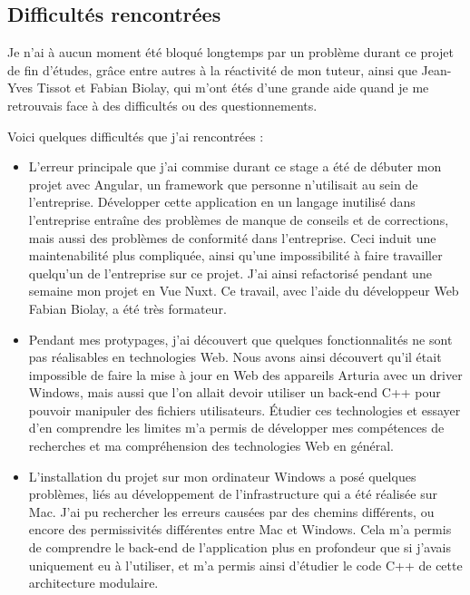 \documentclass[francais]{rapportPFE}  %
\begin{document}
\subsection{Difficultés rencontrées}
Je n'ai à aucun moment été bloqué longtemps par un problème durant ce projet de fin d'études, grâce entre autres à la réactivité de mon tuteur, ainsi que Jean-Yves Tissot et Fabian Biolay, qui m'ont étés d'une grande aide quand je me retrouvais face à des difficultés ou des questionnements. 

Voici quelques difficultés que j'ai rencontrées : 
\begin{itemize}
    \item L'erreur principale que j'ai commise durant ce stage a été de débuter mon projet avec Angular, un framework que personne n'utilisait au sein de l'entreprise. Développer cette application en un langage inutilisé dans l'entreprise entraîne des problèmes de manque de conseils et de corrections, mais aussi des problèmes de conformité dans l'entreprise. Ceci induit une maintenabilité plus compliquée, ainsi qu'une impossibilité à faire travailler quelqu'un de l'entreprise sur ce projet. J'ai ainsi refactorisé pendant une semaine mon projet en Vue Nuxt. Ce travail, avec l'aide du développeur Web Fabian Biolay, a été très formateur.
    \item Pendant mes protypages, j'ai découvert que quelques fonctionnalités ne sont pas réalisables en technologies Web. Nous avons ainsi découvert qu'il était impossible de faire la mise à jour en Web des appareils Arturia avec un driver Windows, mais aussi que l'on allait devoir utiliser un back-end C++ pour pouvoir manipuler des fichiers utilisateurs. Étudier ces technologies et essayer d'en comprendre les limites m'a permis de développer mes compétences de recherches et ma compréhension des technologies Web en général.
    \item L'installation du projet sur mon ordinateur Windows a posé quelques problèmes, liés au développement de l'infrastructure qui a été réalisée sur Mac. J'ai pu rechercher les erreurs causées par des chemins différents, ou encore des permissivités différentes entre Mac et Windows. Cela m'a permis de comprendre le back-end de l'application plus en profondeur que si j'avais uniquement eu à l'utiliser, et m'a permis ainsi d'étudier le code C++ de cette architecture modulaire.

\end{itemize}
\end{document}

